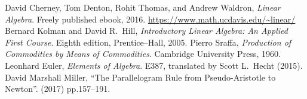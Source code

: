 \begin{thebibliography}{99}
David Cherney, Tom Denton, Rohit Thomas, and Andrew Waldron,\newline
\textit{Linear Algebra}.\newline
Freely published ebook, 2016.\newline
\url{https://www.math.ucdavis.edu/~linear/}
 Bernard Kolman and David R.\ Hill,\newline
\textit{Introductory Linear Algebra: An Applied First Course}.\newline
Eighth edition, Prentice--Hall, 2005.
 Pierro Sraffa,\newline
\textit{Production of Commodities by Means of Commodities}.\newline
Cambridge University Press, 1960.
 Leonhard Euler,\newline
\textit{Elements of Algebra}.\newline
E387, translated by Scott L.\ Hecht (2015).
 David Marshall Miller,\newline
``The Parallelogram Rule from Pseudo-Aristotle to Newton''.\newline
{}  (2017) pp.157--191.\newline
{\tt{}}
\end{thebibliography}